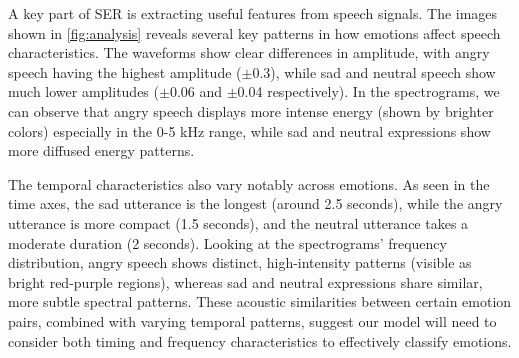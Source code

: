 \documentclass[../main.tex]{subfiles}
\begin{document}
A key part of SER is extracting useful features from speech signals. The images shown 
in \autoref{fig:analysis} reveals several key patterns in how emotions 
affect speech characteristics. The waveforms show clear differences in amplitude, with
angry speech having the highest amplitude ($\pm$0.3), while sad and neutral speech
show much lower amplitudes ($\pm$0.06 and $\pm$0.04 respectively). In the spectrograms,
we can observe that angry speech displays more intense energy
(shown by brighter colors) especially in the 0-5 kHz range, while sad and
neutral expressions show more diffused energy patterns.

The temporal characteristics also vary notably across emotions. As seen in the
time axes, the sad utterance is the longest (around 2.5 seconds), while the
angry utterance is more compact (1.5 seconds), and the neutral utterance takes
a moderate duration (2 seconds). Looking at the spectrograms' frequency
distribution, angry speech shows distinct, high-intensity patterns
(visible as bright red-purple regions), whereas sad and neutral expressions
share similar, more subtle spectral patterns. These acoustic similarities
between certain emotion pairs, combined with varying temporal patterns,
suggest our model will need to consider both timing and frequency
characteristics to effectively classify emotions.
\end{document}
